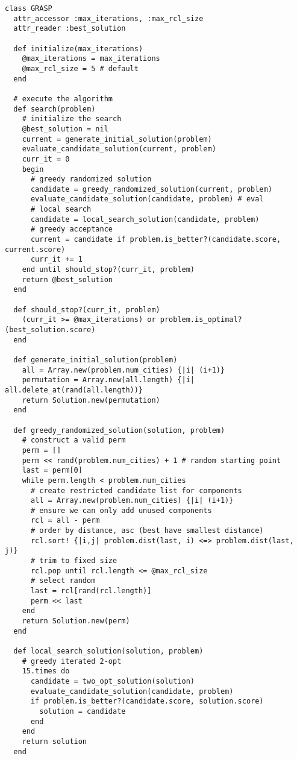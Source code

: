 \begin{lstlisting}
class GRASP
  attr_accessor :max_iterations, :max_rcl_size
  attr_reader :best_solution
  
  def initialize(max_iterations)
    @max_iterations = max_iterations  
    @max_rcl_size = 5 # default  
  end
  
  # execute the algorithm
  def search(problem)
    # initialize the search
    @best_solution = nil
    current = generate_initial_solution(problem)
    evaluate_candidate_solution(current, problem)
    curr_it = 0
    begin
      # greedy randomized solution
      candidate = greedy_randomized_solution(current, problem)  
      evaluate_candidate_solution(candidate, problem) # eval    
      # local search
      candidate = local_search_solution(candidate, problem)
      # greedy acceptance
      current = candidate if problem.is_better?(candidate.score, current.score)
      curr_it += 1
    end until should_stop?(curr_it, problem)
    return @best_solution
  end
  
  def should_stop?(curr_it, problem)
    (curr_it >= @max_iterations) or problem.is_optimal?(best_solution.score)
  end
  
  def generate_initial_solution(problem)
    all = Array.new(problem.num_cities) {|i| (i+1)}
    permutation = Array.new(all.length) {|i| all.delete_at(rand(all.length))}
    return Solution.new(permutation)
  end

  def greedy_randomized_solution(solution, problem)    
    # construct a valid perm
    perm = []
    perm << rand(problem.num_cities) + 1 # random starting point
    last = perm[0]
    while perm.length < problem.num_cities
      # create restricted candidate list for components
      all = Array.new(problem.num_cities) {|i| (i+1)}
      # ensure we can only add unused components
      rcl = all - perm 
      # order by distance, asc (best have smallest distance)
      rcl.sort! {|i,j| problem.dist(last, i) <=> problem.dist(last, j)}
      # trim to fixed size
      rcl.pop until rcl.length <= @max_rcl_size
      # select random
      last = rcl[rand(rcl.length)]
      perm << last
    end    
    return Solution.new(perm)
  end

  def local_search_solution(solution, problem)
    # greedy iterated 2-opt
    15.times do
      candidate = two_opt_solution(solution)
      evaluate_candidate_solution(candidate, problem)
      if problem.is_better?(candidate.score, solution.score)
        solution = candidate 
      end
    end
    return solution
  end


\end{lstlisting}
